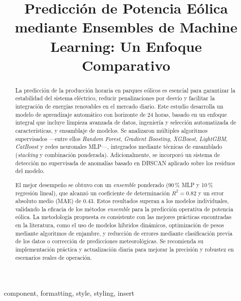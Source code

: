 \documentclass[conference]{IEEEtran}
\title{Predicción de Potencia Eólica mediante Ensembles de Machine Learning: Un Enfoque Comparativo}
\author{
	\IEEEauthorblockN{Luis Koc}
	\IEEEauthorblockA{luis.koc@gmail.com}
	\and
	\IEEEauthorblockN{Alex Mancilla}
	\IEEEauthorblockA{afmancilla@gmail.com}
	\and
	\IEEEauthorblockN{Herbert Melendez}
	\IEEEauthorblockA{hamg.94@gmail.com}
	\and
	\IEEEauthorblockN{Dennis Paitan}
	\IEEEauthorblockA{denniskano@gmail.com}
}
\begin{document}
	
\pagestyle{fancy}
\fancyhf{}
\renewcommand{\headrulewidth}{0.4pt}
\fancyfoot[C]{\thepage}
\renewcommand{\thesubsection}{\Alph{subsection}}

\maketitle

\begin{abstract}
La predicción de la producción horaria en parques eólicos es esencial para garantizar la estabilidad del sistema eléctrico, reducir penalizaciones por desvío y facilitar la integración de energías renovables en el mercado diario. Este estudio desarrolla un modelo de aprendizaje automático con horizonte de 24 horas, basado en un enfoque integral que incluye limpieza avanzada de datos, ingeniería y selección automatizada de características, y ensamblaje de modelos. Se analizaron múltiples algoritmos supervisados —entre ellos \textit{Random Forest}, \textit{Gradient Boosting}, \textit{XGBoost}, \textit{LightGBM}, \textit{CatBoost} y redes neuronales MLP—, integrados mediante técnicas de ensamblado (\textit{stacking} y combinación ponderada). Adicionalmente, se incorporó un sistema de detección no supervisada de anomalías basado en DBSCAN aplicado sobre los residuos del modelo.
		
El mejor desempeño se obtuvo con un \textit{ensemble} ponderado (90\,\% MLP y 10\,\% regresión lineal), que alcanzó un coeficiente de determinación \( R^2 = 0.82 \) y un error absoluto medio (MAE) de 0.43. Estos resultados superan a los modelos individuales, validando la eficacia de los métodos \textit{ensemble} para la predicción operativa de potencia eólica. La metodología propuesta es consistente con las mejores prácticas encontradas en la literatura, como el uso de modelos híbridos dinámicos, optimización de pesos mediante algoritmos de enjambre, y reducción de errores mediante clasificación previa de los datos o corrección de predicciones meteorológicas. Se recomienda su implementación práctica y actualización diaria para mejorar la precisión y robustez en escenarios reales de operación.\\
\end{abstract}

\begin{IEEEkeywords}
component, formatting, style, styling, insert
\end{IEEEkeywords}
\end{document}
